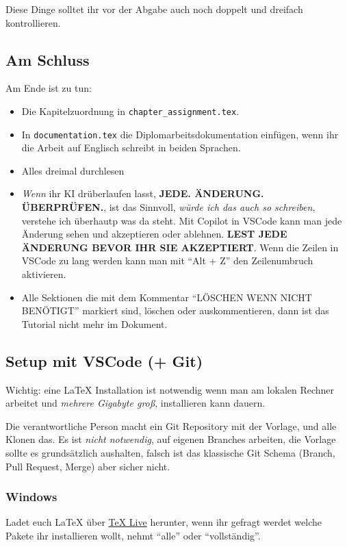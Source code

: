 Diese Dinge solltet ihr vor der Abgabe auch noch doppelt und dreifach kontrollieren.

\subsection{Am Schluss}

Am Ende ist zu tun:
\begin{itemize}
    \item Die Kapitelzuordnung in \verb|chapter_assignment.tex|.
    \item In \verb|documentation.tex| die Diplomarbeitsdokumentation einfügen, wenn ihr die Arbeit auf Englisch schreibt in beiden Sprachen.
    \item Alles dreimal durchlesen
    \item \emph{Wenn} ihr KI drüberlaufen lasst, \textbf{JEDE. ÄNDERUNG. ÜBERPRÜFEN.}, ist das Sinnvoll, \emph{würde ich das auch so schreiben}, verstehe ich überhautp was da steht. Mit Copilot in VSCode kann man jede Änderung sehen und akzeptieren oder ablehnen. \textbf{LEST JEDE ÄNDERUNG BEVOR IHR SIE AKZEPTIERT}. Wenn die Zeilen in VSCode zu lang werden kann man mit ``Alt + Z'' den Zeilenumbruch aktivieren.
    \item Alle Sektionen die mit dem Kommentar ``LÖSCHEN WENN NICHT BENÖTIGT'' markiert sind, löschen oder auskommentieren, dann ist das Tutorial nicht mehr im Dokument.
\end{itemize}

\label{subsec:0-tutorial-vscode}
\subsection{Setup mit VSCode (+ Git)}

Wichtig: eine \LaTeX{} Installation ist notwendig wenn man am lokalen Rechner arbeitet und \emph{mehrere Gigabyte groß}, installieren kann dauern.

Die verantwortliche Person macht ein Git Repository mit der Vorlage, und alle Klonen das. Es ist \emph{nicht notwendig}, auf eigenen Branches arbeiten, die Vorlage sollte es grundsätzlich aushalten, falsch ist das klassische Git Schema (Branch, Pull Request, Merge) aber sicher nicht.

\subsubsection{Windows}
Ladet euch \LaTeX{} über \href{https://www.tug.org/texlive/acquire-netinstall.html}{TeX Live} herunter, wenn ihr gefragt werdet welche Pakete ihr installieren wollt, nehmt ``alle'' oder ``vollständig''.

